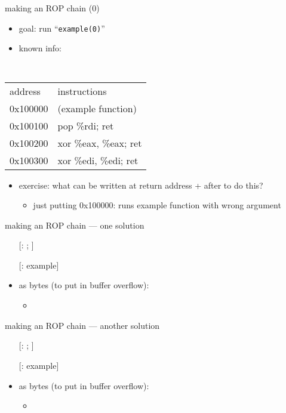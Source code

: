 \begin{frame}[fragile,label=makerop0]{making an ROP chain (0)}
    \begin{itemize}
    \item goal: run ``\texttt{example(0)}''
    \item known info:
    \end{itemize}
{\small \tt
\begin{tabular}{ll}
\normalfont address & \normalfont instructions \\
0x100000 & (example function) \\
0x100100 & pop \%rdi; ret \\
0x100200 & xor \%eax, \%eax; ret \\
0x100300 & xor \%edi, \%edi; ret \\
\end{tabular}
}
\begin{itemize}
\item exercise: what can be written at return address + after to do this?
    \begin{itemize}
    \item just putting 0x100000: runs example function with wrong argument
    \end{itemize}
\end{itemize}
\end{frame}

\begin{frame}[fragile,label=makerop0soln]{making an ROP chain --- one solution}
\begin{itemize}
\item[] [\myemph<4>{0x100100}: \myemph<2>{pop \%rdi}; \myemph<3>{ret}]
\item[] 
\item[] [\myemph<3>{\myemph<6>{0x100000}}: example]
\vspace{.5cm}
\item as bytes (to put in buffer overflow):
    \begin{itemize}
    \item {\tt {} 
               }
    \end{itemize}
\end{itemize}
\end{frame}

\begin{frame}[fragile,label=makerop0solnB]{making an ROP chain --- another solution}
\begin{itemize}
\item[] [\myemph<4>{0x100200}: \myemph<2>{xor \%edi, \%edi}; \myemph<3>{ret}]
\item[] [\myemph<3>{\myemph<5>{0x100000}}: example]
\vspace{.5cm}
\item as bytes (to put in buffer overflow):
    \begin{itemize}
    \item {\tt {} }
    \end{itemize}
\end{itemize}
\end{frame}
